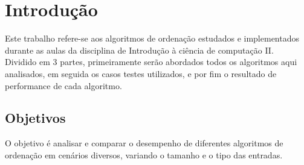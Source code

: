 \chapter{Introdução}
\label{cap:introducao}
Este trabalho refere-se aos algoritmos de ordenação estudados e implementados durante as aulas da disciplina de Introdução à ciência de computação II.\\

Dividido em 3 partes, primeiramente serão abordados todos os algoritmos aqui analisados, em seguida os casos testes utilizados, e por fim o resultado de performance de cada algoritmo.\\


\section{Objetivos}
\label{sec:objetivos}
O objetivo é analisar e comparar o desempenho de diferentes algoritmos de ordenação em cenários diversos, variando o tamanho e o tipo das entradas.

